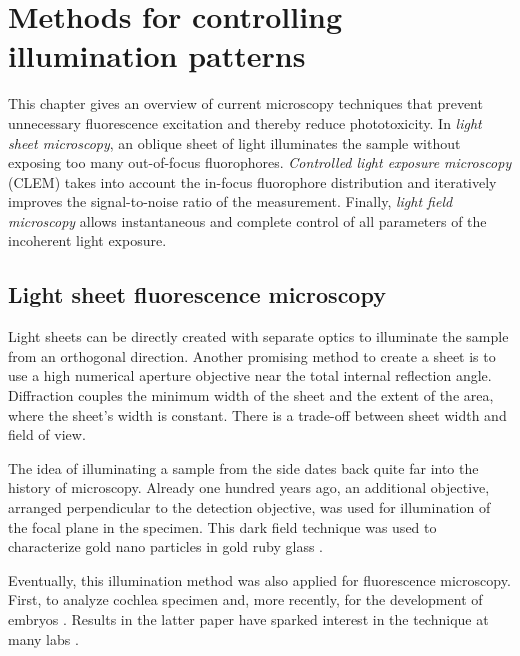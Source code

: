 
\chapter{Methods for controlling illumination patterns}
\label{sec:approaches}
%
\begin{summary}
  This chapter gives an overview of current microscopy techniques that
  prevent unnecessary fluorescence excitation and thereby reduce
  phototoxicity. In \emph{light sheet microscopy}, an oblique sheet of
  light illuminates the sample without exposing too many out-of-focus
  fluorophores. \emph{Controlled light exposure microscopy} (CLEM)
  takes into account the in-focus fluorophore distribution and
  iteratively improves the signal-to-noise ratio of the measurement.
  Finally, \emph{light field microscopy} allows instantaneous and
  complete control of all parameters of the incoherent light exposure.
\end{summary}
\section{Light sheet fluorescence microscopy}
\label{sec:light-sheet-microscopy}
\begin{summary}
  Light sheets can be directly created with separate optics to
  illuminate the sample from an orthogonal direction. Another
  promising method to create a sheet is to use a high numerical
  aperture objective near the total internal reflection
  angle. Diffraction couples the minimum width of the sheet and the
  extent of the area, where the sheet's width is constant. There is a
  trade-off between sheet width and field of view.
\end{summary}
The idea of illuminating a sample from the side dates back quite far
into the history of microscopy. Already one hundred years ago, an
additional objective, arranged perpendicular to the detection
objective, was used for illumination of the focal plane in the
specimen. This dark field technique was used to characterize gold nano
particles in gold ruby glass \citep{Siedentopf1903}.

Eventually, this illumination method was also applied for fluorescence
microscopy. First, to analyze cochlea specimen \citep{Voie1993} and,
more recently, for the development of embryos
\citep{Huisken2004}. Results in the latter paper have sparked interest
in the technique at many labs \citep{Santi2011}.
